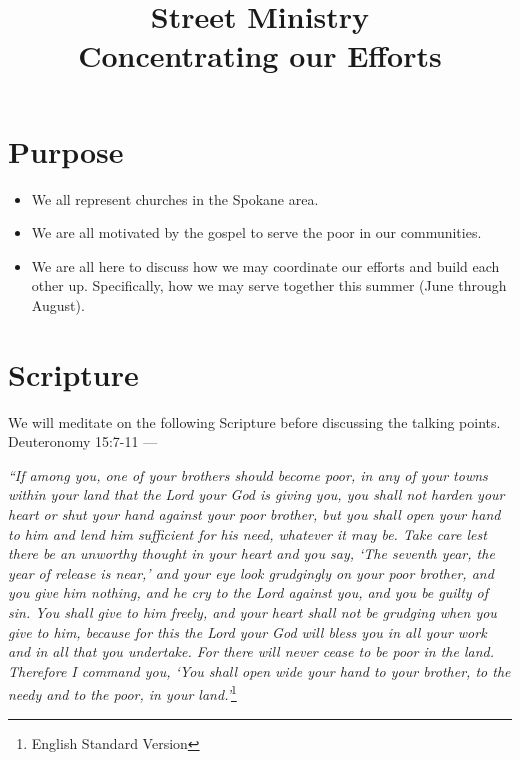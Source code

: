 \documentclass[10pt]{article}
\title{Street Ministry \\
    \large Concentrating our Efforts }
\begin{document}
\maketitle
\section{Purpose}
    \begin{itemize}
        \item{We all represent churches in the Spokane area.}
        \item{We are all motivated by the gospel to serve the poor in our communities.}
        \item{We are all here to discuss how we may coordinate our efforts and build each other up. Specifically, how we may serve together this summer (June through August).}
    \end{itemize}

\section{Scripture}
    We will meditate on the following Scripture before discussing the talking points. \\
    Deuteronomy 15:7-11 ---
    \begin{center}
        \textit{“If among you, one of your brothers should become poor, in any of your towns within your land that the Lord your God is giving you, you shall not harden your heart or shut your hand against your poor brother, but you shall open your hand to him and lend him sufficient for his need, whatever it may be. Take care lest there be an unworthy thought in your heart and you say, ‘The seventh year, the year of release is near,’ and your eye look grudgingly on your poor brother, and you give him nothing, and he cry to the Lord against you, and you be guilty of sin. You shall give to him freely, and your heart shall not be grudging when you give to him, because for this the Lord your God will bless you in all your work and in all that you undertake. For there will never cease to be poor in the land. Therefore I command you, ‘You shall open wide your hand to your brother, to the needy and to the poor, in your land.’}\footnote{English Standard Version}
    \end{center}

\clearpage
\end{document}
